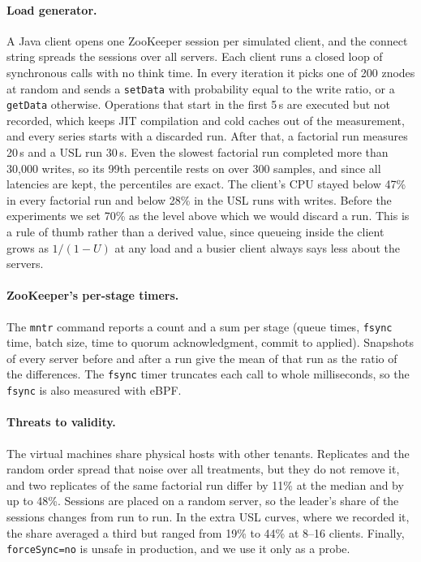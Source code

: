 \documentclass{llncs}
\begin{document}
\paragraph{Load generator.} A Java client opens one ZooKeeper session per simulated client, and the connect string spreads the sessions over all servers. Each client runs a closed loop of synchronous calls with no think time. In every iteration it picks one of 200 znodes at random and sends a \texttt{setData} with probability equal to the write ratio, or a \texttt{getData} otherwise. Operations that start in the first 5\,s are executed but not recorded, which keeps JIT compilation and cold caches out of the measurement, and every series starts with a discarded run. After that, a factorial run measures 20\,s and a USL run 30\,s. Even the slowest factorial run completed more than 30{,}000 writes, so its 99th percentile rests on over 300 samples, and since all latencies are kept, the percentiles are exact. The client's CPU stayed below 47\% in every factorial run and below 28\% in the USL runs with writes. Before the experiments we set 70\% as the level above which we would discard a run. This is a rule of thumb rather than a derived value, since queueing inside the client grows as $1/(1-U)$ at any load and a busier client always says less about the servers.

\paragraph{ZooKeeper's per-stage timers.} The \texttt{mntr} command reports a count and a sum per stage (queue times, \texttt{fsync} time, batch size, time to quorum acknowledgment, commit to applied). Snapshots of every server before and after a run give the mean of that run as the ratio of the differences. The \texttt{fsync} timer truncates each call to whole milliseconds, so the \texttt{fsync} is also measured with eBPF.

\paragraph{Threats to validity.} The virtual machines share physical hosts with other tenants. Replicates and the random order spread that noise over all treatments, but they do not remove it, and two replicates of the same factorial run differ by 11\% at the median and by up to 48\%. Sessions are placed on a random server, so the leader's share of the sessions changes from run to run. In the extra USL curves, where we recorded it, the share averaged a third but ranged from 19\% to 44\% at 8--16 clients. Finally, \texttt{forceSync=no} is unsafe in production, and we use it only as a probe.
\end{document}
